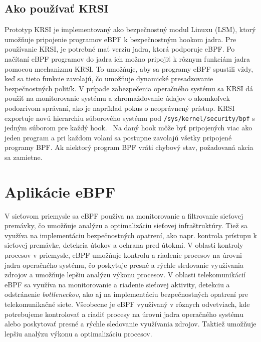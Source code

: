 \subsection*{Ako používať KRSI}
Prototyp KRSI je implementovaný ako bezpečnostný modul Linuxu (LSM), ktorý umožňuje pripojenie programov eBPF k bezpečnostným hookom jadra. 
Pre používanie KRSI, je potrebné mať verziu jadra, ktorá podporuje eBPF. Po načítaní eBPF programov do jadra ich možno pripojiť k rôznym 
funkciám jadra pomocou mechanizmu KRSI. To umožňuje, aby sa programy eBPF spustili vždy, keď sa tieto funkcie zavolajú, čo umožňuje dynamické 
presadzovanie bezpečnostných politík. V prípade zabezpečenia operačného systému sa KRSI dá použiť na monitorovanie systému a zhromažďovanie údajov 
o akomkoľvek podozrivom správaní, ako je napríklad pokus o neoprávnený prístup. KRSI exportuje novú hierarchiu súborového systému 
pod \texttt{/sys/kernel/security/bpf} s jedným súborom pre každý hook.~\cite{krsi-sm} Na daný hook môže byť pripojených viac ako jeden program a pri 
každom volaní sa postupne zavolajú všetky pripojené programy BPF. Ak niektorý program BPF vráti chybový stav, požadovaná akcia sa zamietne.

\section{Aplikácie eBPF}
V sieťovom priemysle sa eBPF používa na monitorovanie a filtrovanie sieťovej premávky, čo umožňuje analýzu a optimalizáciu sieťovej infraštruktúry. 
Tiež sa využíva na implementáciu bezpečnostných opatrení, ako napr. kontrola prístupu k sieťovej premávke, detekcia útokov a ochrana pred útokmi. 
V oblasti kontroly procesov v priemysle, eBPF umožňuje kontrolu a riadenie procesov na úrovni jadra operačného systému, čo poskytuje presné a rýchle sledovanie 
využívania zdrojov a umožňuje lepšiu analýzu výkonu procesov. V oblasti telekomunikácií eBPF sa využíva na monitorovanie a riadenie sieťovej aktivity, 
detekciu a odstránenie \emph{bottleneckov}, ako aj na implementáciu bezpečnostných opatrení pre telekomunikačné siete. Všeobecne je eBPF využívaný v rôznych odvetviach, 
kde potrebujeme kontrolovať a riadiť procesy na úrovni jadra operačného systému alebo poskytovať presné a rýchle sledovanie využívania zdrojov. Taktiež umožňuje lepšiu analýzu výkonu 
a optimalizáciu procesov.

